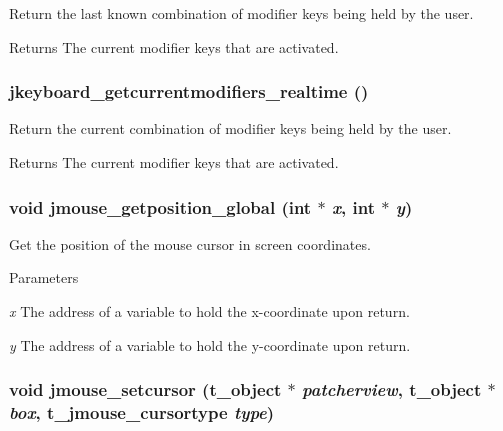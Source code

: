 Return the last known combination of modifier keys being held by the user. \begin{DoxyReturn}{Returns}
The current modifier keys that are activated. 
\end{DoxyReturn}
\hypertarget{group__jmouse_ga8e41a07bb098e3855b9c60f74d29337e}{
\subsubsection[{jkeyboard\_\-getcurrentmodifiers\_\-realtime}]{ jkeyboard\_\-getcurrentmodifiers\_\-realtime ()}}
\label{group__jmouse_ga8e41a07bb098e3855b9c60f74d29337e}


Return the current combination of modifier keys being held by the user. \begin{DoxyReturn}{Returns}
The current modifier keys that are activated. 
\end{DoxyReturn}
\hypertarget{group__jmouse_gaff8fb5e060894aa39293153424c5c939}{
\subsubsection[{jmouse\_\-getposition\_\-global}]{\setlength{\rightskip}{0pt plus 5cm}void jmouse\_\-getposition\_\-global (int $\ast$ {\em x}, \/  int $\ast$ {\em y})}}
\label{group__jmouse_gaff8fb5e060894aa39293153424c5c939}


Get the position of the mouse cursor in screen coordinates. 
\begin{DoxyParams}{Parameters}
\item[{\em x}]The address of a variable to hold the x-\/coordinate upon return. \item[{\em y}]The address of a variable to hold the y-\/coordinate upon return. \end{DoxyParams}
\hypertarget{group__jmouse_gaf8bd554aa25bb4ccd3945a227876fe47}{
\subsubsection[{jmouse\_\-setcursor}]{\setlength{\rightskip}{0pt plus 5cm}void jmouse\_\-setcursor ({\bf t\_\-object} $\ast$ {\em patcherview}, \/  {\bf t\_\-object} $\ast$ {\em box}, \/  {\bf t\_\-jmouse\_\-cursortype} {\em type})}}
\label{group__jmouse_gaf8bd554aa25bb4ccd3945a227876fe47}


